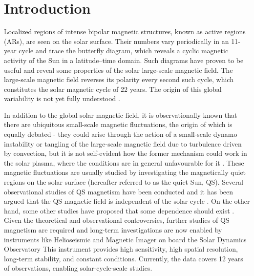 \documentclass{aa}
\begin{document}

\maketitle

\section{Introduction} \label{sec:intro}

Localized regions of intense bipolar magnetic structures, known as active regions
(ARs), are seen on the solar surface. Their numbers vary periodically 
in an 11-year cycle
and trace the
butterfly 
diagram,
which 
reveals 
a cyclic magnetic activity of the Sun in a latitude--time
domain. Such diagrams have proven to be useful and reveal some properties of 
the solar large-scale magnetic field. The large-scale magnetic field reverses its polarity every
second such cycle, which constitutes the solar magnetic cycle of 22 years. The origin of this
global variability is not yet fully understood \citep[see, e.g.,][]{char10}.

In addition to the global solar magnetic field, it is observationally known that there are ubiquitous small-scale magnetic fluctuations, the origin of which is equally debated - they could arise through the action of a small-scale dynamo instability or tangling of the large-scale magnetic field due to turbulence driven by convection, but it is not self-evident how the former mechanism could work in the solar plasma, where the conditions are in general unfavourable for it \citep[see, e.g.,][]{BS05}. These magnetic fluctuations are usually studied by investigating the magnetically quiet regions on the solar surface (hereafter referred to as the quiet Sun, QS). Several observational
studies of QS magnetism have been conducted and it has been argued
that the QS magnetic field is 
independent of the solar cycle 
\cite[see, e.g.,][]{Kleint+10,Buehler+13,Faurobert+15,Jin+15b,Jin+15a}. On the other hand, some other studies have proposed
that some dependence should exist \cite[e.g.,][]{Lites+14,Meunier06,Faurobert+21}. 
Given the theoretical and observational controversies, further studies of QS magnetism are required and long-term investigations are now enabled by instruments like
Helioseismic and Magnetic Imager \cite[HMI,][]{2012SoPh..275..207S,2012SoPh..275..229S} on board the Solar Dynamics Observatory \cite[SDO,][]{2012SoPh..275....3P}
This instrument
provides high sensitivity, high spatial
resolution, long-term stability, and constant conditions. Currently, the data covers 12 years of observations, enabling solar-cycle-scale studies.
\end{document}
